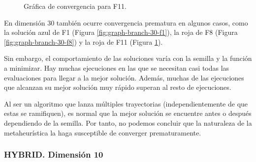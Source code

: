 \documentclass{article}
\begin{document}
\begin{figure}[H]
	\centering
	\caption{Gráfica de convergencia para F11.}
	\label{fig:graph-branch-30-f11}
\end{figure}

En dimensión 30 también ocurre convergencia prematura en algunos casos, como la solución azul de F1 (Figura \ref{fig:graph-branch-30-f1}),
la roja de F8 (Figura \ref{fig:graph-branch-30-f8}) y la roja de F11 (Figura \ref{fig:graph-branch-30-f11}).

 Sin embargo, el comportamiento de las soluciones varía con la semilla y la función a minimizar. Hay muchas ejecuciones
en las que se necesitan casi todas las evaluaciones para llegar a la mejor solución. Además, muchas de las ejecuciones que alcanzan
su mejor solución muy rápido superan al resto de ejecuciones.

Al ser un algoritmo que lanza múltiples trayectorias (independientemente de que estas se ramifiquen), es normal que la mejor
solución se encuentre antes o después dependiendo de la semilla. Por tanto, no podemos concluir que la
naturaleza de la metaheurística la haga susceptible de converger prematuramente.

\subsubsection*{HYBRID. Dimensión 10}
\end{document}
